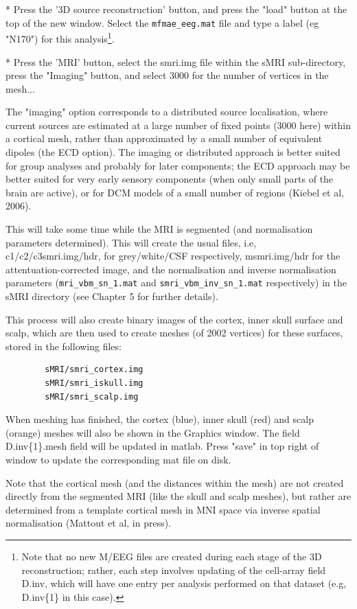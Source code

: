 * Press the '3D source reconstruction' button, and press the "load" button at the top of the new window. Select the \verb!mfmae_eeg.mat! file and type a label (eg "N170") for this analysis\footnote{Note that no new M/EEG files are created during each stage of the 3D reconstruction; rather, each step involves updating of the cell-array field D.inv, which will have one entry per analysis performed on that dataset (e.g, D.inv\{1\} in this case).}.

* Press the 'MRI' button, select the smri.img file within the sMRI sub-directory, press the "Imaging" button, and select 3000 for the number of vertices in the mesh...

The "imaging" option corresponds to a distributed source localisation, where current sources are estimated at a large number of fixed points (3000 here) within a cortical mesh, rather than approximated by a small number of equivalent dipoles (the ECD option). The imaging or distributed approach is better suited for group analyses and probably for later components; the ECD approach may be better suited for very early sensory components (when only small parts of the brain are active), or for DCM models of a small number of regions (Kiebel et al, 2006).

This will take some time while the MRI is segmented (and normalisation parameters determined). This will create the usual files, i.e, c1/c2/c3smri.img/hdr, for grey/white/CSF respectively, msmri.img/hdr for the attentuation-corrected image, and the normalisation and inverse normalisation parameters (\verb!mri_vbm_sn_1.mat! and \verb!smri_vbm_inv_sn_1.mat! respectively) in the sMRI directory (see Chapter 5 for further details).

This process will also create binary images of the cortex, inner skull surface and scalp, which are then used to create meshes (of 2002 vertices) for these surfaces, stored in the following files:
\begin{verbatim}
		sMRI/smri_cortex.img
		sMRI/smri_iskull.img
		sMRI/smri_scalp.img
\end{verbatim}
When meshing has finished, the cortex (blue), inner skull (red) and scalp (orange) meshes will also be shown in the Graphics window. The field D.inv\{1\}.mesh field will be updated in matlab. Press "save" in top right of window to update the corresponding mat file on disk.

Note that the cortical mesh (and the distances within the mesh) are not created directly from the segmented MRI (like the skull and scalp meshes), but rather are determined from a template cortical mesh in MNI space via inverse spatial normalisation (Mattout et al, in press).

